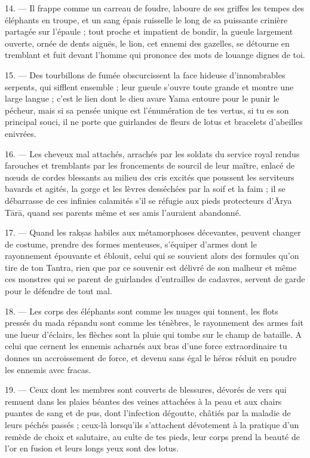 \documentclass[a4paper, 11pt, oneside, french]{article}
\begin{document}
14. --- Il frappe comme un carreau de foudre, laboure de ses griffes les tempes des éléphants en troupe, et un sang épais ruisselle le long de sa puissante crinière partagée sur l'épaule ; tout proche et impatient de bondir, la gueule largement ouverte, ornée de dents aiguës, le lion, cet ennemi des gazelles, se détourne en tremblant et fuit devant l'homme qui prononce des mots de louange dignes de toi.

15. --- Des tourbillons de fumée obscurcissent la face hideuse d'innombrables serpents, qui sifflent ensemble ; leur gueule s'ouvre toute grande et montre une large langue ; c'est le lien dont le dieu avare Yama entoure pour le punir le pécheur, mais si sa pensée unique est l'énumération de tes vertus, si tu es son principal souci, il ne porte que guirlandes de fleurs de lotus et bracelets d'abeilles enivrées.

16. --- Les cheveux mal attachés, arrachés par les soldats du service royal rendus farouches et tremblants par les froncements de sourcil de leur maître, enlacé de nœuds de cordes blessants au milieu des cris excités que poussent les serviteurs bavards et agités, la gorge et les lèvres desséchées par la soif et la faim ; il se débarrasse de ces infinies calamités s'il se réfugie aux pieds protecteurs d'\={A}rya T\={a}r\={a}, quand ses parents même et ses amis l'auraient abandonné.

17. --- Quand les rak\d{s}as habiles aux métamorphoses décevantes, peuvent changer de costume, prendre des formes menteuses, s'équiper d'armes dont le rayonnement épouvante et éblouit, celui qui se souvient alors des formules qu'on tire de ton Tantra, rien que par ce souvenir est délivré de son malheur et même ces monstres qui se parent de guirlandes d'entrailles de cadavres, servent de garde pour le défendre de tout mal.

18. --- Les corps des éléphants sont comme les nuages qui tonnent, les flots pressés du mada répandu sont comme les ténèbres, le rayonnement des armes fait une lueur d'éclairs, les flèches sont la pluie qui tombe sur le champ de bataille. A celui que cernent les ennemis acharnés aux bras d'une force extraordinaire tu donnes un accroissement de force, et devenu sans égal le héros réduit en poudre les ennemis avec fracas.

19. --- Ceux dont les membres sont couverts de blessures, dévorés de vers qui remuent dans les plaies béantes des veines attachées à la peau et aux chairs puantes de sang et de pus, dont l'infection dégoutte, châtiés par la maladie de leurs péchés passés ; ceux-là lorsqu'ils s'attachent dévotement à la pratique d'un remède de choix et salutaire, au culte de tes pieds, leur corps prend la beauté de l'or en fusion et leurs longs yeux sont des lotus.
\end{document}
